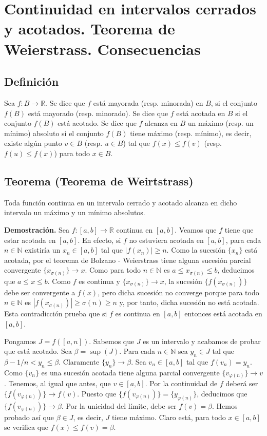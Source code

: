 \documentclass[10pt,a4paper]{article}
\begin{document}
	\newpage
	
	\section{Continuidad en intervalos cerrados y acotados. Teorema de Weierstrass. Consecuencias}
	
	\subsection{Definición}
	Sea $f : B \rightarrow \mathbb{R}$. Se dice que $f$ está mayorada (resp. minorada) en $B$, si el conjunto $f(B)$ está mayorado (resp. minorado). Se dice que $f$ está acotada en $B$ si el conjunto $f(B)$ está acotado. Se dice que $f$ alcanza en $B$ un máximo (resp. un mínimo) absoluto si el conjunto $f(B)$ tiene máximo (resp. mínimo), es decir, existe algún punto $v \in B$ (resp. $u \in B$) tal que $ f(x) \leq f(v)$ (resp. $f(u) \leq f(x)$) para todo $x \in B$.
	
	\subsection{Teorema (Teorema de Weirtstrass)}
	Toda función continua en un intervalo cerrado y acotado alcanza en dicho intervalo un máximo y un mínimo absolutos.
	
	\textbf{Demostración. }Sea $f : [a, b] \rightarrow \mathbb{R}$ continua en $[a, b]$. Veamos que $f$ tiene que estar acotada en $[a, b]$. En efecto, si $f$ no estuviera acotada en $[a, b]$, para cada $n \in \mathbb{N}$ existiría un $x_n \in [a, b]$ tal que $|f(x_n)| \geq n$. Como la sucesión $\{x_n\}$ está acotada, por el teorema de Bolzano - Weierstrass tiene alguna sucesión parcial convergente $\{x_{\sigma(n)}\} \rightarrow x$. Como para todo $n \in \mathbb{N}$ es $a \leq x_{\sigma(n)} \leq b$, deducimos que $a \leq x \leq b$. Como $f$ es continua y $\{x_{\sigma(n)}\} \rightarrow x$, la sucesión $\{f(x_{\sigma(n)})\}$ debe ser convergente a $f(x)$, pero dicha sucesión no converge porque para todo $n \in \mathbb{N}$ es $|f(x_{\sigma(n)})| \geq \sigma(n) \geq n$ y, por tanto, dicha sucesión no está acotada. Esta contradicción prueba que si $f$ es continua en $[a, b]$ entonces está acotada en $[a, b]$.
	
	Pongamos $J = f([a, n])$. Sabemos que $J$ es un intervalo y acabamos de probar que está acotado. Sea $\beta = \sup(J)$. Para cada $n \in \mathbb{N}$ sea $y_n \in J$ tal que $\beta - 1/n < y_n \leq \beta$. Claramente $\{y_n\} \rightarrow \beta$. Sea $v_n \in [a, b]$ tal que $f(v_n) = y_n$. Como $\{v_n\}$ es una sucesión acotada tiene alguna parcial convergente $\{v_{\varphi(n)}\} \rightarrow v$. Tenemos, al igual que antes, que $v \in [a, b]$. Por la continuidad de $f$ deberá ser $\{f(v_{\varphi(n)})\} \rightarrow f(v)$. Puesto que $\{f(v_{\varphi(n)})\} = \{y_{\varphi(n)}\}$, deducimos que $\{f(v_{\varphi(n)})\} \rightarrow \beta$. Por la unicidad del límite, debe ser $f(v) = \beta$. Hemos probado así que $\beta \in J$, es decir, $J$ tiene máximo. Claro está, para todo $x \in [a, b]$ se verifica que $f(x) \leq f(v) = \beta$.
	
\end{document}
